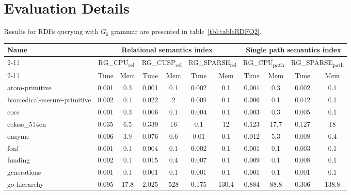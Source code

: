 \section{Evaluation Details}

Results for RDFs querying with $G_2$ grammar are presented in table~\ref{tbl:tableRDFQ2}.

{\setlength{\tabcolsep}{0.4em}
\begin{table*}[h]
\caption{RDFs query $G_2$ (time is measured in seconds and memory is measured in megabytes)}
\label{tbl:tableRDFQ2}
\begin{tabular}{| l | c  c | c  c | c  c | c  c | c  c |}
    \hline

    \multirow{3}{*}{Name}   &   \multicolumn{6}{|c|}{Relational semantics index}	&	\multicolumn{4}{|c|}{Single path semantics index} \\
    \cline{2-11}
    &	\multicolumn{2}{|c|}{RG\_CPU\textsubscript{rel}}	&	\multicolumn{2}{|c|}{RG\_CUSP\textsubscript{rel}}	&	\multicolumn{2}{|c|}{RG\_SPARSE\textsubscript{rel}} &	\multicolumn{2}{|c|}{RG\_CPU\textsubscript{path}}	&	\multicolumn{2}{|c|}{RG\_SPARSE\textsubscript{path}}	 \\
    \cline{2-11}
    &   Time & Mem &  Time     & Mem & Time     & Mem  &  Time     & Mem & Time     & Mem \\
    \hline
    \hline
    atom-primitive          & 0.001 & 0.3  & 0.001 & 0.1 & 0.002 & 0.1   & 0.001 & 0.3  & 0.002 & 0.1   \\
biomedical-mesure-primitive & 0.002 & 0.1  & 0.022 & 2   & 0.009 & 0.1   & 0.006 & 0.1  & 0.012 & 0.1   \\
core                        & 0.001 & 0.3  & 0.006 & 0.1 & 0.004 & 0.1   & 0.003 & 0.3  & 0.005 & 0.1   \\
eclass\_514en               & 0.035 & 6.5  & 0.339 & 16  & 0.1   & 12    & 0.123 & 17.7 & 0.127 & 18    \\
enzyme                      & 0.006 & 3.9  & 0.076 & 0.6 & 0.01  & 0.1   & 0.012 & 5.3  & 0.008 & 0.4   \\
foaf                        & 0.001 & 0.1  & 0.004 & 0.1 & 0.002 & 0.1   & 0.001 & 0.1  & 0.003 & 0.1   \\
funding                     & 0.002 & 0.1  & 0.015 & 0.4 & 0.007 & 0.1   & 0.009 & 0.1  & 0.008 & 0.1   \\
generations                 & 0.001 & 0.1  & 0.001 & 0.1 & 0.001 & 0.1   & 0.001 & 0.1  & 0.001 & 0.1   \\
go-hierarchy                & 0.095 & 17.8 & 2.025 & 528 & 0.175 & 130.4 & 0.884 & 88.8 & 0.306 & 138.8 \\

\end{tabular}
\end{table*}}
